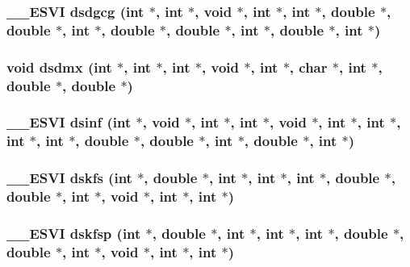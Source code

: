 \subsubsection{\setlength{\rightskip}{0pt plus 5cm}\_\-\_\-ESVI dsdgcg (int $\ast$, int $\ast$, void $\ast$, int $\ast$, int $\ast$, double $\ast$, double $\ast$, int $\ast$, double $\ast$, double $\ast$, int $\ast$, double $\ast$, int $\ast$)}\label{essl_8h_b5a8d42e69b19bed7433a88e661daf41}


\subsubsection{\setlength{\rightskip}{0pt plus 5cm}void dsdmx (int $\ast$, int $\ast$, int $\ast$, void $\ast$, int $\ast$, char $\ast$, int $\ast$, double $\ast$, double $\ast$)}\label{essl_8h_7f313d0a5e4fa5dd989a2fb4e2ba5a65}


\subsubsection{\setlength{\rightskip}{0pt plus 5cm}\_\-\_\-ESVI dsinf (int $\ast$, void $\ast$, int $\ast$, int $\ast$, void $\ast$, int $\ast$, int $\ast$, int $\ast$, int $\ast$, double $\ast$, double $\ast$, int $\ast$, double $\ast$, int $\ast$)}\label{essl_8h_5764cbd16d16c357faec866118624b86}


\subsubsection{\setlength{\rightskip}{0pt plus 5cm}\_\-\_\-ESVI dskfs (int $\ast$, double $\ast$, int $\ast$, int $\ast$, int $\ast$, double $\ast$, double $\ast$, int $\ast$, void $\ast$, int $\ast$, int $\ast$)}\label{essl_8h_16d978c1088fd05e78a476671ae6cb0a}


\subsubsection{\setlength{\rightskip}{0pt plus 5cm}\_\-\_\-ESVI dskfsp (int $\ast$, double $\ast$, int $\ast$, int $\ast$, int $\ast$, double $\ast$, double $\ast$, int $\ast$, void $\ast$, int $\ast$, int $\ast$)}\label{essl_8h_a736e60664718a8b22fe0a3854e52e57}


